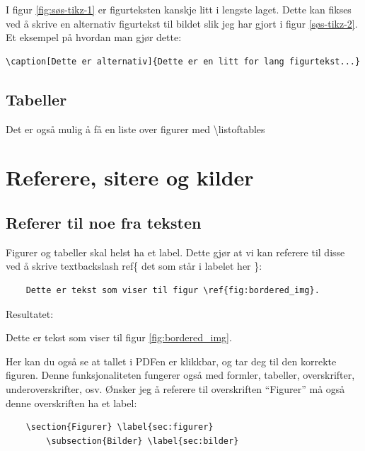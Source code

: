         I figur \ref{fig:søs-tikz-1} er figurteksten kanskje litt i lengste laget. Dette kan fikses ved å skrive en alternativ figurtekst til bildet slik jeg har gjort i figur \ref{søs-tikz-2}.
        Et eksempel på hvordan man gjør dette:
        \begin{verbatim}
\caption[Dette er alternativ]{Dette er en litt for lang figurtekst...}
        \end{verbatim}
        
    \subsection{Tabeller}
        Det er også mulig å få en liste over figurer med \textbackslash listoftables
        \listoftables 
        

\section{Referere, sitere og kilder}
    \subsection{Referer til noe fra teksten}
        Figurer og tabeller skal helst ha et label. Dette gjør at vi kan referere til disse ved å skrive textbackslash ref\{ det som står i labelet her \}:
        \begin{verbatim}
    Dette er tekst som viser til figur \ref{fig:bordered_img}.
        \end{verbatim}
        Resultatet:
            
        Dette er tekst som viser til figur \ref{fig:bordered_img}.
        
        Her kan du også se at tallet i PDFen er klikkbar, og tar deg til den korrekte figuren. Denne funksjonaliteten fungerer også med formler, tabeller, overskrifter, underoverskrifter, osv. Ønsker jeg å referere til overskriften ``Figurer'' må også denne overskriften ha et label:
        \begin{verbatim}
    \section{Figurer} \label{sec:figurer}
        \subsection{Bilder} \label{sec:bilder}
        \end{verbatim}
        
